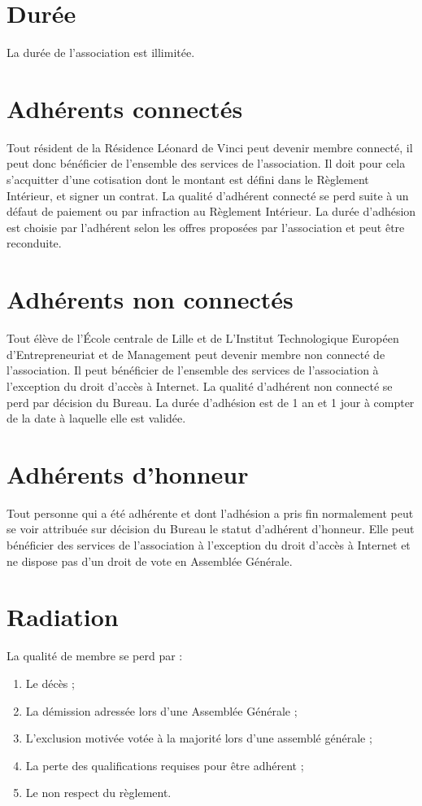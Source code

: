 \documentclass[12pt]{constitution}
\begin{document}
	\section{Durée}
	La durée de l’association est illimitée.


	\section{Adhérents connectés}
	Tout résident de la Résidence Léonard de Vinci peut devenir membre connecté, il peut donc bénéficier de l’ensemble des services de l’association. Il doit pour cela s’acquitter d’une cotisation dont le montant est défini dans le Règlement Intérieur, et signer un contrat. La qualité d’adhérent connecté se perd suite à un défaut de paiement ou par infraction au Règlement Intérieur. La durée d’adhésion est choisie par l’adhérent selon les offres proposées par l’association et peut être reconduite.

	\section{Adhérents non connectés}
	Tout élève de l’École centrale de Lille et de L’Institut Technologique Européen d'Entrepreneuriat et de Management peut devenir membre non connecté de l’association. Il peut bénéficier de l’ensemble des services de l’association à l’exception du droit d’accès à Internet. La qualité d’adhérent non connecté se perd par décision du Bureau. La durée d’adhésion est de 1 an et 1 jour à compter de la date à laquelle elle est validée.

	\section{Adhérents d'honneur}
	Tout personne qui a été adhérente et dont l’adhésion a pris fin normalement peut se voir attribuée sur décision du Bureau le statut d’adhérent d’honneur. Elle peut bénéficier des services de l’association à l’exception du droit d’accès à Internet et ne dispose pas d’un droit de vote en Assemblée Générale.

	\section{Radiation}
	La qualité de membre se perd par :
	\begin{enumerate}
		\item[\textbullet] Le décès ;
		\item[\textbullet] La démission adressée lors d'une Assemblée Générale ;
		\item[\textbullet] L'exclusion motivée votée à la majorité lors d'une assemblé générale ;
		\item[\textbullet] La perte des qualifications requises pour être adhérent ;
		\item[\textbullet] Le non respect du règlement.
	\end{enumerate}
\end{document}
